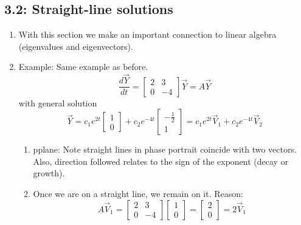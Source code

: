 \documentclass{article}
\begin{document}
\subsection{3.2: Straight-line solutions}	

\begin{enumerate}

\item With this section we make an important connection to linear algebra (eigenvalues and eigenvectors).

\item Example: Same example as before.
\[
\frac{d\vec{Y}}{dt} = 
\begin{bmatrix}
2 & 3 \\
0 & -4
\end{bmatrix} \vec{Y} = A \vec{Y}
\]
with general solution
\[
\vec{Y} = 
c_1 e^{2t} 
\begin{bmatrix}
1 \\
0
\end{bmatrix}
+
c_2 e^{-4t} 
\begin{bmatrix}
-\frac{1}{2} \\
1
\end{bmatrix}
= c_1 e^{2t}\vec{V}_1 + c_2e^{-4t}\vec{V}_2\]
\begin{enumerate}
\item pplane: Note straight lines in phase portrait coincide with two vectors. Also, direction followed relates to the sign of the exponent (decay or growth).
\item Once we are on a straight line, we remain on it. Reason:
\[
A\vec{V}_1 = 
\begin{bmatrix}
2 & 3 \\
0 & -4
\end{bmatrix} 
\begin{bmatrix}
1 \\ 0
\end{bmatrix} 
=
\begin{bmatrix}
2 \\ 0
\end{bmatrix}
= 2 \vec{V}_1
\]
\end{enumerate}


\end{enumerate}
\end{document}
